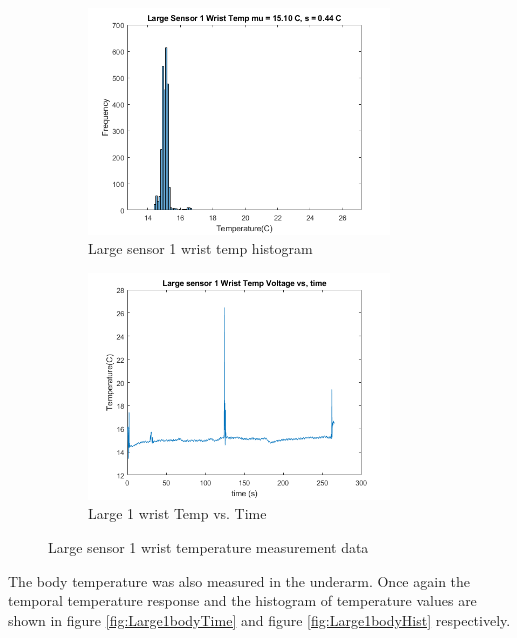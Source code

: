 \documentclass[12pt,a4paper]{report}
\begin{document}
\begin{figure}[h!]
\begin{subfigure}{0.5\textwidth}
    \includegraphics[width=1\linewidth, height=6cm]{Images/Large1WristHist.png}
    \caption{Large sensor 1 wrist temp histogram}
    \label{fig:Large1wristHist}
\end{subfigure}
\begin{subfigure}{0.5\textwidth}
    \includegraphics[width=1\linewidth, height=6cm]{Images/Large1WristTime.png}
    \caption{Large 1 wrist Temp vs. Time}
    \label{fig:Large1wristTime}
\end{subfigure}
\caption{Large sensor 1 wrist temperature measurement data}
\label{LargeSensor1Wrist }
\end{figure}

The body temperature was also measured in the underarm. Once again the temporal temperature response and the histogram of temperature values are shown in figure \ref{fig:Large1bodyTime} and figure \ref{fig:Large1bodyHist} respectively. 
\end{document}
